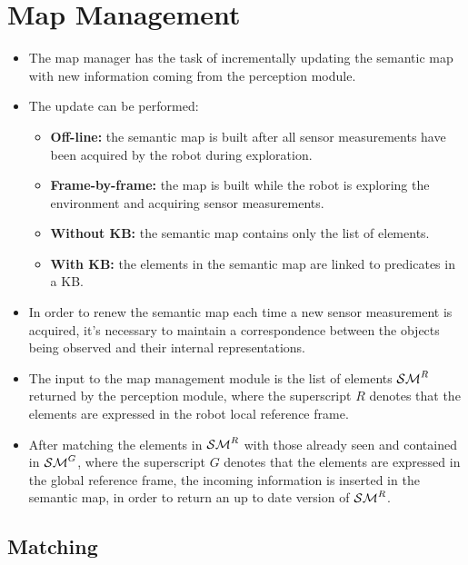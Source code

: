 \documentclass{article}
\begin{document}
	\section{Map Management}
	
	\begin{itemize}
		\item The map manager has the task of incrementally updating the semantic map with new information coming from the perception module. 
		\item The update can be performed:
		\begin{itemize}
			\item {\bf Off-line:} the semantic map is built after all sensor measurements have been acquired by the robot during exploration.
			\item {\bf Frame-by-frame:} the map is built while the robot is exploring the environment and acquiring sensor measurements.
			\item {\bf Without KB:} the semantic map contains only the list of elements.
			\item {\bf With KB:} the elements in the semantic map are linked to predicates in a KB.
		\end{itemize}
		\item In order to renew the semantic map each time a new sensor measurement is acquired, it's necessary to maintain a correspondence between the objects being observed and their internal representations.
		\item The input to the map management module is the list of elements $\mathcal{SM}^R$ returned by the perception module, where the superscript $R$ denotes that the elements are expressed in the robot local reference frame.
		\item After matching the elements in $\mathcal{SM}^R$ with those already seen and contained in $\mathcal{SM}^G$, where the superscript $G$ denotes that the elements are expressed in the global reference frame, the incoming information is inserted in the semantic map, in order to return an up to date version of $\mathcal{SM}^R$.
	\end{itemize}
	
	\subsection{Matching}
	
\end{document}
